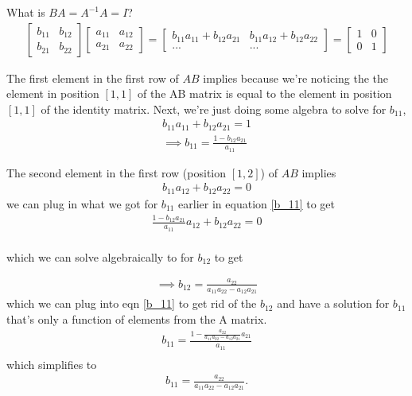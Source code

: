 \documentclass{article}
\begin{document}
What is $BA = A^{-1}A = I$?
\begin{align}
    \begin{bmatrix}
        b_{11} & b_{12} \\
        b_{21} & b_{22}
    \end{bmatrix}
    \begin{bmatrix}
        a_{11} & a_{12} \\
        a_{21} & a_{22}
    \end{bmatrix}
    =     \begin{bmatrix}
        b_{11}a_{11} + b_{12}a_{21} & b_{11}a_{12} + b_{12}a_{22} \\
        ... & ...
    \end{bmatrix} = 
    \begin{bmatrix}
        1 & 0 \\
        0 & 1
    \end{bmatrix}
\end{align}

The first element in the first row of $AB$ implies because we're noticing the the element in position $[1,1]$ of the AB matrix is equal to the element in position $[1,1]$ of the identity matrix. Next, we're just doing some algebra to solve for $b_{11}$,
\begin{align}
    b_{11}a_{11} + b_{12}a_{21} = 1\\
    \implies b_{11} = \frac{1 - b_{12} a_{21}}{a_{11}} \label{b_11}
\end{align}

The second element in the first row (position $[1, 2]$) of $AB$ implies 
\begin{align}
    b_{11}a_{12} + b_{12}a_{22} = 0 
\end{align}
we can plug in what we got for $b_{11}$ earlier in equation \ref{b_11} to get 
\begin{align}
     \frac{1 - b_{12} a_{21}}{a_{11}} a_{12} + b_{12}a_{22} = 0 \\
\end{align}

which we can solve algebraically to for $b_{12}$ to get

\begin{align}
     \implies b_{12} = \frac{a_{22}}{a_{11} a_{22} - a_{12} a_{21}}
\end{align}
which we can plug into eqn \ref{b_11} to get rid of the $b_{12}$ and have a solution for $b_{11}$ that's only a function of elements from the A matrix. 
\begin{align}
    b_{11} = \frac{1 - \frac{a_{22}}{a_{11} a_{22} - a_{12} a_{21}} a_{21}}{a_{11}} \\
\end{align}
which simplifies to 
\begin{align}
   b_{11} = \frac{a_{22}}{a_{11} a_{22} - a_{12} a_{21}}. 
\end{align}
\end{document}
